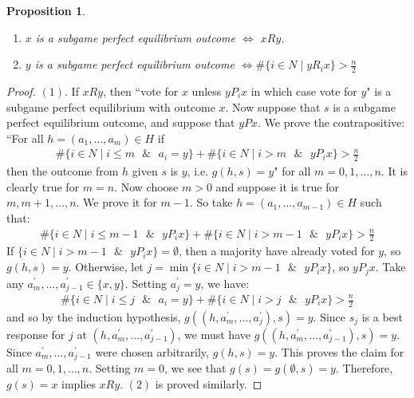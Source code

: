 \documentclass[12pt]{article}
\newtheorem{propo}{Proposition}[section]
\newcommand{\n}{\noindent}
\newcommand{\s}{\vspace{5mm}}
\begin{document}
\s
\n
\begin{propo}\mbox{}  \begin{enumerate}
\item $x$ is a subgame perfect equilibrium outcome $\Longleftrightarrow$ $xRy$.
\item $y$ is a subgame perfect equilibrium outcome $\Longleftrightarrow \#\{i\in N\mid yR_ix\}>\frac{n}{2}$
\end{enumerate}
\end{propo}
\begin{proof}  $(1)$.  If $xRy$, then ``vote for $x$ unless $yP_ix$ in which case vote for $y$" is a subgame perfect equilibrium with outcome $x$.  Now suppose that $s$ is a subgame perfect equilibrium outcome, and suppose that $yPx$.  We prove the contrapositive: ``For all $h=(a_1,\hdots,a_m)\in H$ if
\begin{eqnarray*}
\#\{i\in N\mid i\leq m\mbox{ } \& \mbox{ } a_i=y\}+\#\{i\in N\mid i>m \mbox{ } \& \mbox{ } yP_ix\}>\frac{n}{2}
\end{eqnarray*}
then the outcome from $h$ given $s$ is $y$, i.e. $g(h,s)=y$" for all $m=0,1,\hdots,n$.  It is clearly true for $m=n$.  Now choose $m>0$ and suppose it is true for $m,m+1,\hdots,n$.  We prove it for $m-1$.  So take $h=(a_1,\hdots,a_{m-1})\in H$ such that:
\begin{eqnarray*}
\#\{i\in N\mid i\leq m-1 \mbox{ } \& \mbox{ } yP_ix\}+\#\{i\in N\mid i>m-1 \mbox{ } \& \mbox{ } yP_ix\}>\frac{n}{2}
\end{eqnarray*} If $\{i\in N\mid i>m-1 \mbox{ } \& \mbox{ } yP_ix\}=\emptyset$, then a majority have already voted for $y$, so $g(h,s)=y$.  Otherwise, let $j=\min\{i\in N\mid i>m-1 \mbox{ } \& \mbox{ } yP_ix\}$, so $yP_jx$.  Take any $a_m^{\prime},\hdots,a_{j-1}^{\prime}\in\{x,y\}$.  Setting $a_j^{\prime}=y$, we have:
\begin{eqnarray*}
\#\{i\in N\mid i\leq j\mbox{ } \&\mbox{ } a_i=y\}+\#\{i\in N\mid i>j\mbox{ } \&\mbox{ } yP_ix\}>\frac{n}{2}
\end{eqnarray*} and so by the induction hypothesis, $g((h,a_m^{\prime},\hdots,a_j^{\prime}),s)=y$.  Since $s_j$ is a best response for $j$ at $(h,a_m^{\prime},\hdots,a_{j-1}^{\prime})$, we must have $g((h,a_m^{\prime},\hdots,a_{j-1}^{\prime}),s)=y$.  Since $a_m^{\prime},\hdots,a_{j-1}^{\prime}$ were chosen arbitrarily, $g(h,s)=y$.  This proves the claim for all $m=0,1,\hdots,n$.  Setting $m=0$, we see that $g(s)=g(\emptyset,s)=y$.  Therefore, $g(s)=x$ implies $xRy$.  $(2)$ is proved similarly.
\end{proof}
\end{document}
